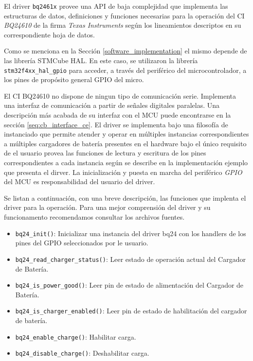 \documentclass[10pt, a4paper]{article}
\newcounter{subsubsubsection}[subsubsection]
\begin{document}

El driver \texttt{bq2461x} provee una \acrshort{API} de baja complejidad que
implementa las estructuras de datos, definiciones y funciones necesarias para la
operación del \acrshort{CI} \emph{BQ24610} de la firma \emph{Texas
Instruments} según los lineamientos descriptos en su correspondiente hoja de
datos. 

Como se menciona en la Secci\'on \ref{software_implementation} el mismo
depende de las librer\'ia STMCube \acrshort{HAL}.
En este caso, se utilizaron la librer\'ia \texttt{stm32f4xx\_hal\_gpio} para
acceder, a través del periférico del microcontrolador, a los pines de propósito
general GPIO del micro.

El \acrshort{CI} BQ24610 no dispone de ningun tipo de comunicación serie.
Implementa una interfaz de comunicación a partir de señales digitales paralelas.
Una descripción más acabada de su interfaz con el \acrshort{MCU} puede
encontrarse en la sección \ref{seq:cb_interface_ce}. El driver se implementa
bajo una filosofía de instanciado que permite atender y operar en múltiples
instancias correspondientes a múltiples cargadores de batería presentes en el
hardware bajo el único requisito de el usuario provea las funciones de lectura y
escritura de los pines correspondientes a cada instancia según se describe en la
implementación ejemplo que presenta el dirver. La inicialización y puesta en
marcha del periférico \emph{GPIO} del \acrshort{MCU} es responsabilidad del
usuario del driver.

Se listan a continuación, con una breve descripción, las funciones que implenta
el driver para la operación. Para una mejor comprensión del driver y su
funcionamento recomendamos consultar los archivos fuentes.

\begin{itemize}
    \item \texttt{bq24\_init()}: Inicializar una instancia del driver bq24 con
        los handlers de los pines del GPIO seleccionados por le usuario.
    \item \texttt{bq24\_read\_charger\_status()}: Leer estado de operación
        actual del Cargador de Batería.
    \item \texttt{bq24\_is\_power\_good()}: Leer pin de estado de alimentación
        del Cargador de Batería.
    \item \texttt{bq24\_is\_charger\_enabled()}: Leer pin de estado de
        habilitación del cargador de batería.
    \item \texttt{bq24\_enable\_charge()}: Habilitar carga.
    \item \texttt{bq24\_disable\_charge()}: Deshabilitar carga.
\end{itemize}
\end{document}
